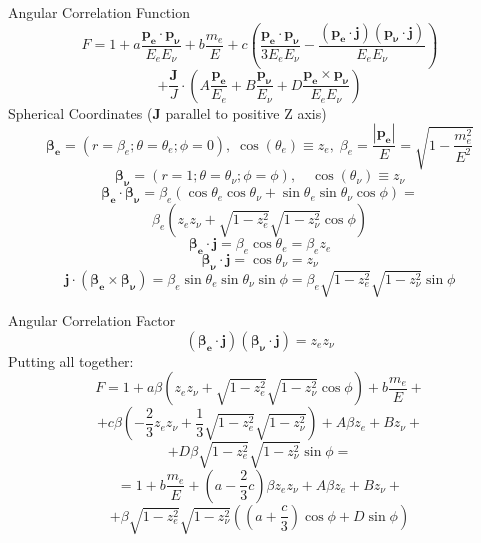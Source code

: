 \documentclass{beamer}
\begin{document}
\begin{frame}{Angular Correlation Function}
	$$F = 1 + a \frac{\boldsymbol{p_e}\cdot\boldsymbol{p_\nu}}{E_eE_\nu} + b \frac{m_e}{E} + c \left(\frac{\boldsymbol{p_e}\cdot\boldsymbol{p_\nu}}{3E_eE_\nu}-\frac{(\boldsymbol{p_e}\cdot\boldsymbol{j})(\boldsymbol{p_\nu}\cdot\boldsymbol{j})}{E_eE_\nu}\right) $$$$+ \frac{\boldsymbol{J}}J\cdot\left(A \frac{\boldsymbol{p_e}}{E_e} + B \frac{\boldsymbol{p_\nu}}{E_\nu} + D \frac{\boldsymbol{p_e}\times\boldsymbol{p_\nu}}{E_eE_\nu}\right)$$
	Spherical Coordinates ($\boldsymbol{J}$ parallel to positive Z axis)
	$$\boldsymbol{\beta_e} = (r=\beta_e;\theta=\theta_e;\phi=0),\;\cos(\theta_e) \equiv z_e,\;\beta_e = \frac{|\boldsymbol{p_e}|}{E} = \sqrt{1-\frac{m_e^2}{E^2}}$$
	$$\boldsymbol{\beta_\nu} = (r=1;\theta=\theta_\nu;\phi=\phi),\quad\cos(\theta_\nu) \equiv z_\nu$$
	$$\boldsymbol{\beta_e}\cdot\boldsymbol{\beta_\nu} = \beta_e(\cos\theta_e\cos\theta_\nu + \sin\theta_e\sin\theta_\nu\cos\phi) =$$
	$$ \beta_e(z_ez_\nu + \sqrt{1-z^2_e}\sqrt{1-z^2_\nu}\cos\phi)$$
	$$\boldsymbol{\beta_e}\cdot\boldsymbol{j} = \beta_e\cos\theta_e=\beta_ez_e$$
	$$\boldsymbol{\beta_\nu}\cdot\boldsymbol{j} = \cos\theta_\nu=z_\nu$$
	$$\boldsymbol{j}\cdot(\boldsymbol{\beta_e}\times\boldsymbol{\beta_\nu})=\beta_e\sin\theta_e\sin\theta_\nu\sin\phi=\beta_e\sqrt{1-z^2_e}\sqrt{1-z^2_\nu}\sin\phi$$
\end{frame}	
\begin{frame}{Angular Correlation Factor}
	$$(\boldsymbol{\beta_e}\cdot\boldsymbol{j})(\boldsymbol{\beta_\nu}\cdot\boldsymbol{j}) = z_ez_\nu$$
	Putting all together:
	$$F = 1 + a\beta(z_ez_\nu+\sqrt{1-z_e^2}\sqrt{1-z_\nu^2}\cos\phi) + b\frac {m_e}E +$$
	$$+c\beta\left(-\frac{2}{3}z_ez_\nu+\frac{1}{3}\sqrt{1-z_e^2}\sqrt{1-z_\nu^2}\right)+A\beta z_e+ Bz_\nu+$$
	$$+D\beta\sqrt{1-z_e^2}\sqrt{1-z_\nu^2}\sin\phi =$$
	$$ = 1 + b\frac {m_e}E + \left(a-\frac 23 c\right)\beta z_ez_\nu+ A\beta z_e + Bz_\nu +$$
	$$ + \beta \sqrt{1-z_e^2}\sqrt{1-z_\nu^2} \left(\left(a+\frac c3\right)\cos\phi + D \sin\phi\right)$$
\end{frame}
\end{document}
